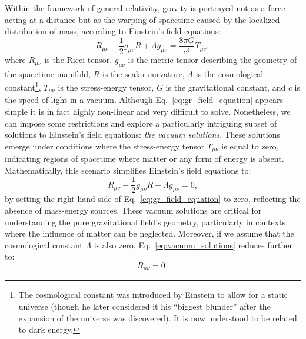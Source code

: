 \documentclass[main.tex]{subfiles}
\begin{document}
    Within the framework of general relativity, gravity is portrayed not as a force acting at a distance but as the warping of spacetime caused by the localized distribution of mass, according to Einstein's field equations:
    \begin{equation}\label{eq:gr_field_equation}
        R_{\mu \nu} - \frac{1}{2}g_{\mu \nu}R + \Lambda g_{\mu \nu} = \frac{8\pi G}{c^4} T_{\mu \nu}, 
    \end{equation}
    where $R_{\mu \nu}$ is the Ricci tensor, $g_{\mu \nu}$ is the metric tensor describing the geometry of the spacetime manifold, $R$ is the scalar curvature, $\Lambda$ is the cosmological constant\footnote{The cosmological constant was introduced by Einstein to allow for a static universe (though he later considered it his ``biggest blunder'' after the expansion of the universe was discovered). It is now understood to be related to dark energy.}, $T_{\mu \nu}$ is the stress-energy tensor, $G$ is the gravitational constant, and $c$ is the speed of light in a vacuum. Although Eq.~\eqref{eq:gr_field_equation} appears simple it is in fact highly non-linear and very difficult to solve. Nonetheless, we can impose some restrictions and explore a particularly intriguing subset of solutions to Einstein's field equations: \textit{the vacuum solutions}. These solutions emerge under conditions where the stress-energy tensor $T_{\mu \nu}$ is equal to zero, indicating regions of spacetime where matter or any form of energy is absent. Mathematically, this scenario simplifies Einstein's field equations to:
    \begin{equation}\label{eq:vacuum_solutions}
    R_{\mu \nu} - \frac{1}{2}g_{\mu \nu}R + \Lambda g_{\mu \nu} = 0,
    \end{equation}
    by setting the right-hand side of Eq.~\eqref{eq:gr_field_equation} to zero, reflecting the absence of mass-energy sources. These vacuum solutions are critical for understanding the pure gravitational field's geometry, particularly in contexts where the influence of matter can be neglected. Moreover, if we assume that the cosmological constant $\Lambda$ is also zero, Eq.~\eqref{eq:vacuum_solutions} reduces further to:
    \begin{equation}
        R_{\mu \nu} = 0\,.
    \end{equation}
    
\end{document}
